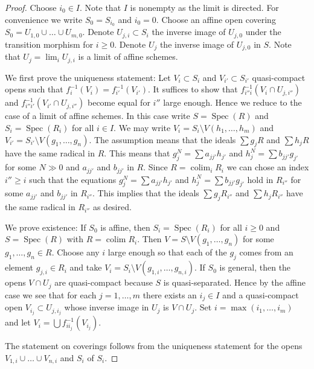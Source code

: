 \documentclass{stacks-project}
\theoremstyle{plain}
\theoremstyle{definition}
\theoremstyle{remark}
\numberwithin{equation}{subsection}
\def\lim{\mathop{\mathrm{lim}}\nolimits}
\def\colim{\mathop{\mathrm{colim}}\nolimits}
\def\Spec{\mathop{\mathrm{Spec}}}
\begin{document}
\begin{proof}
Choose $i_0 \in I$. Note that $I$ is nonempty as the limit is directed.
For convenience we write $S_0 = S_{i_0}$ and $i_0 = 0$.
Choose an affine open covering $S_0 = U_{1, 0} \cup \ldots \cup U_{m, 0}$.
Denote $U_{j, i} \subset S_i$ the inverse image of $U_{j, 0}$
under the transition morphism for $i \geq 0$.
Denote $U_j$ the inverse image of $U_{j, 0}$ in $S$.
Note that $U_j = \lim_i U_{j, i}$ is a limit of affine
schemes.

\medskip\noindent
We first prove the uniqueness statement: Let
$V_i \subset S_i$ and $V_{i'} \subset S_{i'}$
quasi-compact opens such that $f_i^{-1}(V_i) = f_{i'}^{-1}(V_{i'})$.
It suffices to show that $f_{i''i}^{-1}(V_i \cap U_{j, i''})$ and
$f_{i''i'}^{-1}(V_{i'} \cap U_{j, i''})$ become equal
for $i''$ large enough. Hence we reduce to the case
of a limit of affine schemes. In this case write
$S = \Spec(R)$ and $S_i = \Spec(R_i)$ for all $i \in I$.
We may write $V_i = S_i \setminus V(h_1, \ldots, h_m)$
and $V_{i'} = S_{i'} \setminus V(g_1, \ldots, g_n)$.
The assumption means that the ideals
$\sum g_jR$ and $\sum h_jR$ have the same radical
in $R$. This means that $g_j^N = \sum a_{jj'}h_{j'}$ and
$h_j^N = \sum b_{jj'} g_{j'}$ for some $N \gg 0$ and $a_{jj'}$
and $b_{jj'}$ in $R$.
Since $R = \colim_i R_i$ we can chose an index
$i'' \geq i$ such that the equations
$g_j^N = \sum a_{jj'}h_{j'}$ and
$h_j^N = \sum b_{jj'} g_{j'}$ hold in $R_{i''}$ for some
$a_{jj'}$ and $b_{jj'}$ in $R_{i''}$. This implies that
the ideals $\sum g_jR_{i''}$ and $\sum h_jR_{i''}$ have the same radical
in $R_{i''}$ as desired.

\medskip\noindent
We prove existence: If $S_0$ is affine, then $S_i = \Spec(R_i)$ for all
$i \geq 0$ and $S = \Spec(R)$ with $R = \colim R_i$. Then
$V = S \setminus V(g_1, \ldots, g_n)$ for some $g_1, \ldots, g_n \in R$.
Choose any $i$ large enough so that each of the $g_j$ comes from an
element $g_{j, i} \in R_i$ and take
$V_i = S_i \setminus V(g_{1, i}, \ldots, g_{n, i})$.
If $S_0$ is general, then the opens $V \cap U_j$
are quasi-compact because $S$ is quasi-separated. Hence by the
affine case we see that for each $j = 1, \ldots, m$
there exists an $i_j \in I$ and a quasi-compact open
$V_{i_j} \subset U_{j, i_j}$ whose inverse image in $U_j$
is $V \cap U_j$. Set $i = \max(i_1, \ldots, i_m)$
and let $V_i = \bigcup f_{ii_j}^{-1}(V_{i_j})$.

\medskip\noindent
The statement on coverings follows from the uniqueness statement
for the opens $V_{1, i} \cup \ldots \cup V_{n, i}$ and $S_i$ of $S_i$.
\end{proof}
\end{document}
